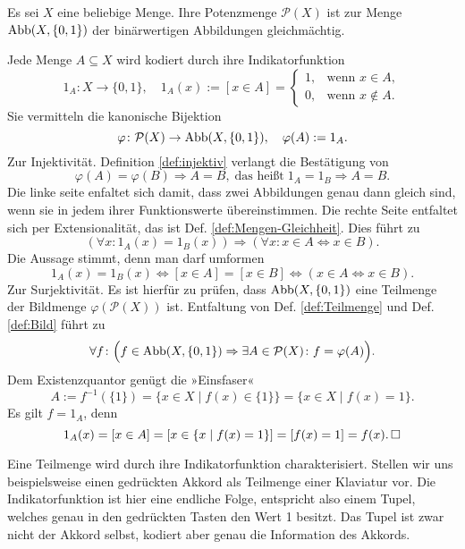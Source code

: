 \begin{Satz}
Es sei $X$ eine beliebige Menge. Ihre Potenzmenge $\mathcal P(X)$ ist
zur Menge $\operatorname{Abb}(X,\{0,1\})$ der binärwertigen Abbildungen gleichmächtig.
\end{Satz}

\begin{Beweis}
Jede Menge $A\subseteq X$ wird kodiert durch ihre
Indikatorfunktion
\[1_A\colon X\to\{0,1\},\quad 1_A(x) := [x\in A] =
\begin{cases}
1, & \text{wenn $x\in A$},\\
0, & \text{wenn $x\notin A$}.
\end{cases}\]
Sie vermitteln die kanonische Bijektion
\[\varphi\colon\mathcal P(X)\to\operatorname{Abb}(X,\{0,1\}),\quad \varphi(A):=1_A.\]
Zur Injektivität. Definition \ref{def:injektiv} verlangt die Bestätigung von%
\[\varphi(A)=\varphi(B)\Rightarrow A=B,\;\text{das heißt}\;
1_A=1_B \Rightarrow A=B.\]
Die linke seite enfaltet sich damit, dass zwei Abbildungen genau dann
gleich sind, wenn sie in jedem ihrer Funktionswerte
übereinstimmen. Die rechte Seite entfaltet sich per Extensionalität,
das ist Def. \ref{def:Mengen-Gleichheit}. Dies führt zu
\[(\forall x\colon 1_A(x)=1_B(x))\Rightarrow
(\forall x\colon x\in A\Leftrightarrow x\in B).\]
Die Aussage stimmt, denn man darf umformen
\[1_A(x)=1_B(x)\iff [x\in A]=[x\in B] \iff (x\in A\Leftrightarrow x\in B).\]
Zur Surjektivität. Es ist hierfür zu prüfen, dass $\operatorname{Abb}(X,\{0,1\})$ eine
Teilmenge der Bildmenge $\varphi(\mathcal P(X))$ ist.
Entfaltung von Def. \ref{def:Teilmenge} und Def. \ref{def:Bild} führt zu%
\[\forall f\colon \Big(f\in\operatorname{Abb}(X,\{0,1\})\Rightarrow\exists A\in\mathcal P(X)\colon f=\varphi(A)\Big).\]
Dem Existenzquantor genügt die »Einsfaser«
\[A := f^{-1}(\{1\}) = \{x\in X\mid f(x)\in \{1\}\} = \{x\in X\mid f(x)=1\}.\]
Es gilt $f=1_A$, denn
\[1_A(x) = [x\in A] = [x\in\{x\mid f(x)=1\}] = [f(x)=1] = f(x).\,\Box\]
\end{Beweis}

\noindent
Eine Teilmenge wird durch ihre Indikatorfunktion charakterisiert.
Stellen wir uns beispielsweise einen gedrückten Akkord als Teilmenge
einer Klaviatur vor. Die Indikatorfunktion ist hier eine endliche
Folge, entspricht also einem Tupel, welches genau in den gedrückten
Tasten den Wert 1 besitzt. Das Tupel ist zwar nicht der Akkord selbst,
kodiert aber genau die Information des Akkords.

